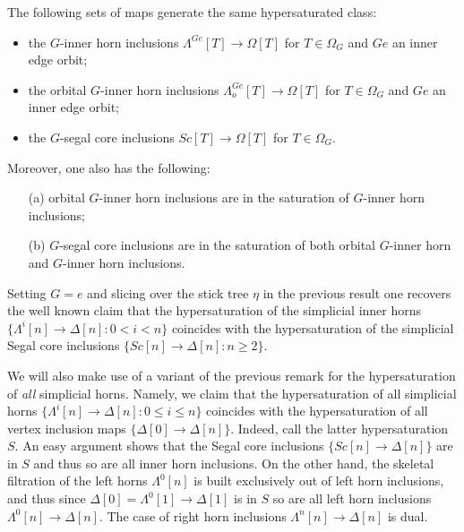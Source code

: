 \documentclass[a4paper,10pt,draft]{article}%
\numberwithin{equation}{section}%
\numberwithin{figure}{section}
\begin{document}
\begin{proposition}\label{HYPER PROP}
The following sets of maps generate the same hypersaturated class:
\begin{itemize}
\item the $G$-inner horn inclusions
$\Lambda^{Ge} [T] \to \Omega[T]$ for $T \in \Omega_G$ and $Ge$ an inner edge orbit; 
\item the orbital $G$-inner horn inclusions
$\Lambda^{Ge}_o [T] \to \Omega[T]$ for $T \in \Omega_G$ and $Ge$ an inner edge orbit; 
\item the $G$-segal core inclusions
$Sc [T] \to \Omega[T]$ for $T \in \Omega_G$.
\end{itemize}
Moreover, one also has the following:
\begin{itemize}
	\item[(a)] orbital $G$-inner horn inclusions are in the saturation of $G$-inner horn inclusions;
	\item[(b)] $G$-segal core inclusions are in the saturation of both orbital $G$-inner horn and $G$-inner horn inclusions.
\end{itemize}
\end{proposition}


\begin{remark}
	Setting $G=e$ and slicing over the stick tree $\eta$ in the previous result
	one recovers the well known claim that 
	the hypersaturation of the simplicial inner horns
	$\{\Lambda^i[n] \to \Delta[n] \colon 0< i < n\}$
	coincides with the hypersaturation of the simplicial Segal core inclusions
	$\{Sc[n] \to \Delta[n]\colon n \geq 2\}$.
\end{remark}


\begin{remark}\label{HYPERSATKAN REM}
	We will also make use of a variant of the previous remark for the hypersaturation of \textit{all} simplicial horns.
	Namely, we claim that the hypersaturation of all simplicial horns 
	$\{\Lambda^i[n] \to \Delta[n] \colon 0 \leq i \leq n\}$
	coincides with the hypersaturation of all vertex inclusion maps
	$\{\Delta[0] \to \Delta[n]\}$.
	Indeed, call the latter hypersaturation $S$. 
	An easy argument shows that the Segal core inclusions 
	$\{Sc[n] \to \Delta[n]\}$ are in $S$ and thus so are all inner horn inclusions. On the other hand, the skeletal filtration of the left horns $\Lambda^0[n]$ is built exclusively out of left horn inclusions, and thus since $\Delta[0]=\Lambda^0[1] \to \Delta[1]$ is in $S$ so are all left horn inclusions 
	$\Lambda^0[n] \to \Delta[n]$. The case of right horn inclusions $\Lambda^n[n] \to \Delta[n]$ is dual.
\end{remark}
\end{document}
